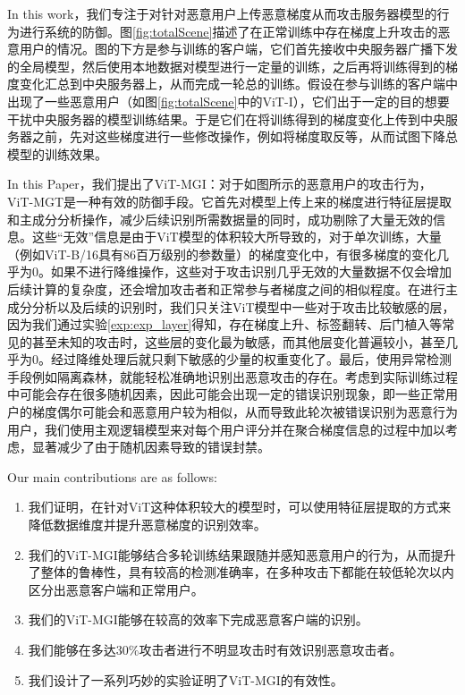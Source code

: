 \documentclass[conference]{IEEEtran}
\begin{document}
In this work，我们专注于对针对恶意用户上传恶意梯度从而攻击服务器模型的行为进行系统的防御。图\hyperref[fig:totalScene]{\ref{fig:totalScene}}描述了在正常训练中存在梯度上升攻击的恶意用户的情况。图的下方是参与训练的客户端，它们首先接收中央服务器广播下发的全局模型，然后使用本地数据对模型进行一定量的训练，之后再将训练得到的梯度变化汇总到中央服务器上，从而完成一轮总的训练。假设在参与训练的客户端中出现了一些恶意用户（如图\hyperref[fig:totalScene]{\ref{fig:totalScene}}中的ViT-I），它们出于一定的目的想要干扰中央服务器的模型训练结果。于是它们在将训练得到的梯度变化上传到中央服务器之前，先对这些梯度进行一些修改操作，例如将梯度取反等，从而试图下降总模型的训练效果。

In this Paper，我们提出了ViT-MGI：对于如图所示的恶意用户的攻击行为，ViT-MGT是一种有效的防御手段。它首先对模型上传上来的梯度进行特征层提取和主成分分析操作，减少后续识别所需数据量的同时，成功剔除了大量无效的信息。这些“无效”信息是由于ViT模型的体积较大所导致的，对于单次训练，大量（例如ViT-B/16具有86百万级别的参数量）的梯度变化中，有很多梯度的变化几乎为0。如果不进行降维操作，这些对于攻击识别几乎无效的大量数据不仅会增加后续计算的复杂度，还会增加攻击者和正常参与者梯度之间的相似程度。在进行主成分分析以及后续的识别时，我们只关注ViT模型中一些对于攻击比较敏感的层，因为我们通过实验\hyperref[exp:exp_layer]{\ref{exp:exp_layer}}得知，存在梯度上升、标签翻转、后门植入等常见的甚至未知的攻击时，这些层的变化最为敏感，而其他层变化普遍较小，甚至几乎为0。经过降维处理后就只剩下敏感的少量的权重变化了。最后，使用异常检测手段例如隔离森林，就能轻松准确地识别出恶意攻击的存在。考虑到实际训练过程中可能会存在很多随机因素，因此可能会出现一定的错误识别现象，即一些正常用户的梯度偶尔可能会和恶意用户较为相似，从而导致此轮次被错误识别为恶意行为用户，我们使用主观逻辑模型来对每个用户评分并在聚合梯度信息的过程中加以考虑，显著减少了由于随机因素导致的错误封禁。

Our main contributions are as follows:

\begin{enumerate}
    \item 我们证明，在针对ViT这种体积较大的模型时，可以使用特征层提取的方式来降低数据维度并提升恶意梯度的识别效率。
    \item 我们的ViT-MGI能够结合多轮训练结果跟随并感知恶意用户的行为，从而提升了整体的鲁棒性，具有较高的检测准确率，在多种攻击下都能在较低轮次以内区分出恶意客户端和正常用户。
    \item 我们的ViT-MGI能够在较高的效率下完成恶意客户端的识别。
    \item 我们能够在多达$30\%$攻击者进行不明显攻击时有效识别恶意攻击者。
    \item 我们设计了一系列巧妙的实验证明了ViT-MGI的有效性。
\end{enumerate}
\end{document}
